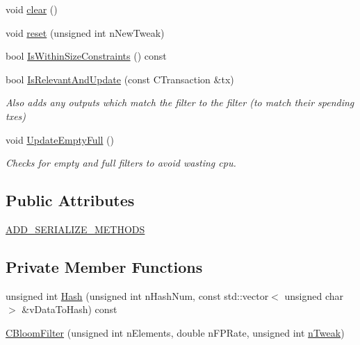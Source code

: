 \begin{DoxyCompactItemize}
void \mbox{\hyperlink{class_c_bloom_filter_abf30228c0b24c57530f6b6734cd40252}{clear}} ()
\item 
void \mbox{\hyperlink{class_c_bloom_filter_a2af19739385bad826cfec9f236b65533}{reset}} (unsigned int n\+New\+Tweak)
\item 
bool \mbox{\hyperlink{class_c_bloom_filter_a06f2094da8e7d9c6ad4ea426858e32de}{Is\+Within\+Size\+Constraints}} () const
\item 
bool \mbox{\hyperlink{class_c_bloom_filter_aec420a9b66ab133090c2b4b8ed286f79}{Is\+Relevant\+And\+Update}} (const C\+Transaction \&tx)
\begin{DoxyCompactList}\small\item\em Also adds any outputs which match the filter to the filter (to match their spending txes) \end{DoxyCompactList}\item 
void \mbox{\hyperlink{class_c_bloom_filter_af98b43e91c82a1e4afc7454e8c5672c2}{Update\+Empty\+Full}} ()
\begin{DoxyCompactList}\small\item\em Checks for empty and full filters to avoid wasting cpu. \end{DoxyCompactList}\end{DoxyCompactItemize}
\subsection*{Public Attributes}
\begin{DoxyCompactItemize}
\item 
\mbox{\hyperlink{class_c_bloom_filter_aac1b6a065059e07177ec836929190ad0}{A\+D\+D\+\_\+\+S\+E\+R\+I\+A\+L\+I\+Z\+E\+\_\+\+M\+E\+T\+H\+O\+DS}}
\end{DoxyCompactItemize}
\subsection*{Private Member Functions}
\begin{DoxyCompactItemize}
\item 
unsigned int \mbox{\hyperlink{class_c_bloom_filter_a19031bd85ec49cb6f6d2cd8aa3414c75}{Hash}} (unsigned int n\+Hash\+Num, const std\+::vector$<$ unsigned char $>$ \&v\+Data\+To\+Hash) const
\item 
\mbox{\hyperlink{class_c_bloom_filter_a5ef6ddc09c07e6b921934a84cd770395}{C\+Bloom\+Filter}} (unsigned int n\+Elements, double n\+F\+P\+Rate, unsigned int \mbox{\hyperlink{class_c_bloom_filter_af372d9a72fd69dc5e9f31e38ab84bf29}{n\+Tweak}})
\end{DoxyCompactItemize}

